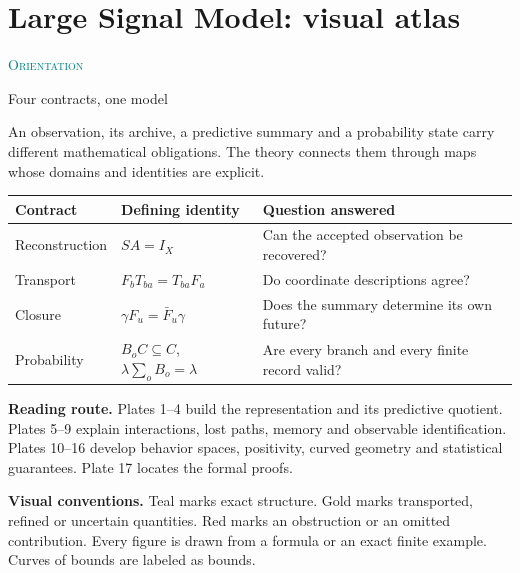 \documentclass[11pt,oneside,openany]{book}
\numberwithin{equation}{section}
\begin{document}
\chapter{Large Signal Model: visual atlas}
\textcolor{teal}{\small\textsc{Orientation}}\par
{\fontsize{23}{26}\selectfont Four contracts, one model}\par
An observation, its archive, a predictive summary and a probability state carry different mathematical obligations. The theory connects them through maps whose domains and identities are explicit.
\begin{tabular}{@{}p{.19\linewidth}p{.32\linewidth}p{.42\linewidth}@{}}
\toprule
Contract & Defining identity & Question answered\\\midrule
Reconstruction & $SA=I_X$ & Can the accepted observation be recovered?\\[5pt]
Transport & $F_bT_{ba}=T_{ba}F_a$ & Do coordinate descriptions agree?\\[5pt]
Closure & $\gamma F_u=\bar F_u\gamma$ & Does the summary determine its own future?\\[5pt]
Probability & $B_oC\subseteq C$, $\lambda\sum_oB_o=\lambda$ & Are every branch and every finite record valid?\\\bottomrule
\end{tabular}
\vspace{10pt}
\textbf{Reading route.} Plates 1--4 build the representation and its predictive quotient. Plates 5--9 explain interactions, lost paths, memory and observable identification. Plates 10--16 develop behavior spaces, positivity, curved geometry and statistical guarantees. Plate 17 locates the formal proofs.

\textbf{Visual conventions.} Teal marks exact structure. Gold marks transported, refined or uncertain quantities. Red marks an obstruction or an omitted contribution. Every figure is drawn from a formula or an exact finite example. Curves of bounds are labeled as bounds.

\end{document}
